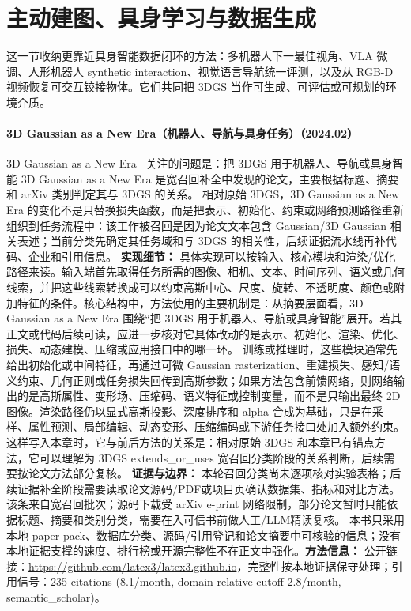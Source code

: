 \section{主动建图、具身学习与数据生成}

这一节收纳更靠近具身智能数据闭环的方法：多机器人下一最佳视角、VLA 微调、人形机器人 synthetic interaction、视觉语言导航统一评测，以及从 RGB-D 视频恢复可交互铰接物体。它们共同把 3DGS 当作可生成、可评估或可规划的环境介质。
\paragraph{3D Gaussian as a New Era（机器人、导航与具身任务）（2024.02）}
3D Gaussian as a New Era~\cite{2402_07181} 关注的问题是：把 3DGS 用于机器人、导航或具身智能 3D Gaussian as a New Era 是宽召回补全中发现的论文，主要根据标题、摘要和 arXiv 类别判定其与 3DGS 的关系。
相对原始 3DGS，3D Gaussian as a New Era 的变化不是只替换损失函数，而是把表示、初始化、约束或网络预测路径重新组织到任务流程中：该工作被召回是因为论文文本包含 Gaussian/3D Gaussian 相关表述；当前分类先确定其任务域和与 3DGS 的相关性，后续证据流水线再补代码、企业和引用信息。
\textbf{实现细节：} 具体实现可以按输入、核心模块和渲染/优化路径来读。输入端首先取得任务所需的图像、相机、文本、时间序列、语义或几何线索，并把这些线索转换成可以约束高斯中心、尺度、旋转、不透明度、颜色或附加特征的条件。核心结构中，方法使用的主要机制是：从摘要层面看，3D Gaussian as a New Era 围绕“把 3DGS 用于机器人、导航或具身智能”展开。若其正文或代码后续可读，应进一步核对它具体改动的是表示、初始化、渲染、优化、损失、动态建模、压缩或应用接口中的哪一环。 训练或推理时，这些模块通常先给出初始化或中间特征，再通过可微 Gaussian rasterization、重建损失、感知/语义约束、几何正则或任务损失回传到高斯参数；如果方法包含前馈网络，则网络输出的是高斯属性、变形场、压缩码、语义特征或控制变量，而不是只输出最终 2D 图像。渲染路径仍以显式高斯投影、深度排序和 alpha 合成为基础，只是在采样、属性预测、局部编辑、动态变形、压缩编码或下游任务接口处加入额外约束。这样写入本章时，它与前后方法的关系是：相对原始 3DGS 和本章已有锚点方法，它可以理解为 3DGS extends\_or\_uses 宽召回分类阶段的关系判断，后续需要按论文方法部分复核。
\textbf{证据与边界：} 本轮召回分类尚未逐项核对实验表格；后续证据补全阶段需要读取论文源码/PDF或项目页确认数据集、指标和对比方法。 该条来自宽召回批次；源码下载受 arXiv e-print 网络限制，部分论文暂时只能依据标题、摘要和类别分类，需要在入可信书前做人工/LLM精读复核。 本书只采用本地 paper pack、数据库分类、源码/引用登记和论文摘要中可核验的信息；没有本地证据支撑的速度、排行榜或开源完整性不在正文中强化。\textbf{方法信息：} 公开链接：\url{https://github.com/latex3/latex3.github.io}，完整性按本地证据保守处理；引用信号：235 citations (8.1/month, domain-relative cutoff 2.8/month, semantic\_scholar)。
